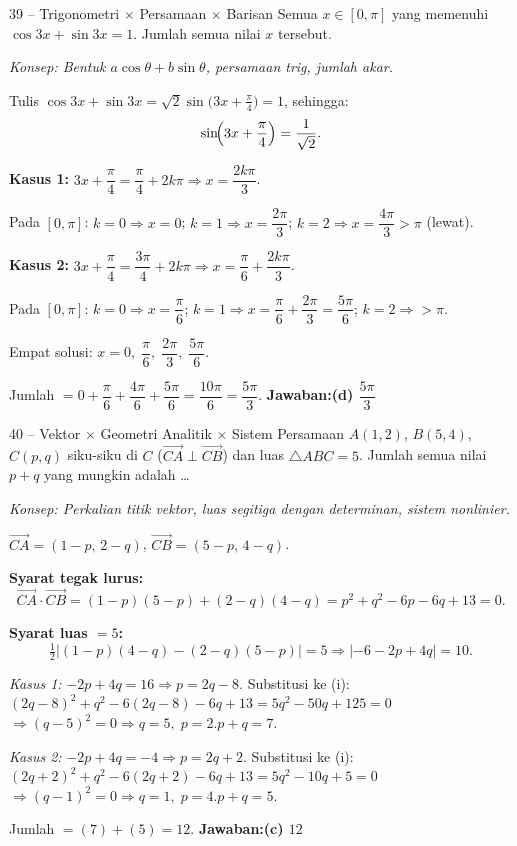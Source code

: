\documentclass[11pt]{article}
\newcommand{\jawaban}[1]{\textbf{Jawaban:}\enspace\colorbox{gold!30}{\textbf{#1}}}
\newcommand{\konsep}[1]{\textit{Konsep: #1.}}
\begin{document}
\begin{soal}{39 -- Trigonometri $\times$ Persamaan $\times$ Barisan}
Semua $x\in[0,\pi]$ yang memenuhi $\cos3x+\sin3x=1$. Jumlah semua nilai $x$ tersebut.
\end{soal}
\begin{pembox}
\konsep{Bentuk $a\cos\theta+b\sin\theta$, persamaan trig, jumlah akar}

Tulis $\cos3x+\sin3x=\sqrt{2}\sin\!\bigl(3x+\tfrac{\pi}{4}\bigr)=1$, sehingga:
\[
\sin\!\Bigl(3x+\frac{\pi}{4}\Bigr)=\frac{1}{\sqrt{2}}.
\]

\textbf{Kasus 1:} $3x+\dfrac{\pi}{4}=\dfrac{\pi}{4}+2k\pi\Rightarrow x=\dfrac{2k\pi}{3}$.

Pada $[0,\pi]$: $k=0\Rightarrow x=0$;\; $k=1\Rightarrow x=\dfrac{2\pi}{3}$;\; $k=2\Rightarrow x=\dfrac{4\pi}{3}>\pi$ (lewat).

\textbf{Kasus 2:} $3x+\dfrac{\pi}{4}=\dfrac{3\pi}{4}+2k\pi\Rightarrow x=\dfrac{\pi}{6}+\dfrac{2k\pi}{3}$.

Pada $[0,\pi]$: $k=0\Rightarrow x=\dfrac{\pi}{6}$;\; $k=1\Rightarrow x=\dfrac{\pi}{6}+\dfrac{2\pi}{3}=\dfrac{5\pi}{6}$;\; $k=2\Rightarrow>\pi$.

Empat solusi: $x=0,\;\dfrac{\pi}{6},\;\dfrac{2\pi}{3},\;\dfrac{5\pi}{6}$.

Jumlah $=0+\dfrac{\pi}{6}+\dfrac{4\pi}{6}+\dfrac{5\pi}{6}=\dfrac{10\pi}{6}=\dfrac{5\pi}{3}$.
\jawaban{(d) $\dfrac{5\pi}{3}$}
\end{pembox}

\begin{soal}{40 -- Vektor $\times$ Geometri Analitik $\times$ Sistem Persamaan}
$A(1,2)$, $B(5,4)$, $C(p,q)$ siku-siku di $C$ ($\vec{CA}\perp\vec{CB}$) dan luas $\triangle ABC=5$.
Jumlah semua nilai $p+q$ yang mungkin adalah \ldots
\end{soal}
\begin{pembox}
\konsep{Perkalian titik vektor, luas segitiga dengan determinan, sistem nonlinier}

$\vec{CA}=(1-p,\,2-q)$, $\vec{CB}=(5-p,\,4-q)$.

\textbf{Syarat tegak lurus:}
\[
\vec{CA}\cdot\vec{CB}=(1-p)(5-p)+(2-q)(4-q)=p^2+q^2-6p-6q+13=0.\tag{i}
\]

\textbf{Syarat luas $=5$:}
\[
\tfrac{1}{2}|(1-p)(4-q)-(2-q)(5-p)|=5\Rightarrow|-6-2p+4q|=10.
\]

\textit{Kasus 1:} $-2p+4q=16\Rightarrow p=2q-8$. Substitusi ke (i):
$(2q-8)^2+q^2-6(2q-8)-6q+13=5q^2-50q+125=0$
$\Rightarrow(q-5)^2=0\Rightarrow q=5,\;p=2$.\quad $p+q=7$.

\textit{Kasus 2:} $-2p+4q=-4\Rightarrow p=2q+2$. Substitusi ke (i):
$(2q+2)^2+q^2-6(2q+2)-6q+13=5q^2-10q+5=0$
$\Rightarrow(q-1)^2=0\Rightarrow q=1,\;p=4$.\quad $p+q=5$.

Jumlah $=(7)+(5)=12$.
\jawaban{(c) $12$}
\end{pembox}
\end{document}
